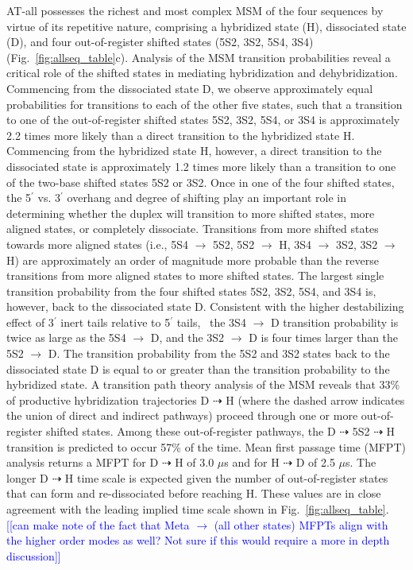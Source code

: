 \documentclass[journal=jpcbfk,manuscript=article]{achemso}
\newcommand*{\noteb}[1]{\textcolor{blue}{[[#1]]}}		%
\begin{document}
AT-all possesses the richest and most complex MSM of the four sequences by virtue of its repetitive nature, comprising a hybridized state (H), dissociated state (D), and four out-of-register shifted states (5S2, 3S2, 5S4, 3S4) (Fig.~\ref{fig:allseq_table}c). Analysis of the MSM transition probabilities reveal a critical role of the shifted states in mediating hybridization and dehybridization. Commencing from the dissociated state D, we observe approximately equal probabilities for transitions to each of the other five states, such that a transition to one of the out-of-register shifted states 5S2, 3S2, 5S4, or 3S4 is approximately 2.2 times more likely than a direct transition to the hybridized state H. Commencing from the hybridized state H, however, a direct transition to the dissociated state is approximately 1.2 times more likely than a transition to one of the two-base shifted states 5S2 or 3S2. Once in one of the four shifted states, the 5$^\prime$ vs. 3$^\prime$ overhang and degree of shifting play an important role in determining whether the duplex will transition to more shifted states, more aligned states, or completely dissociate. Transitions from more shifted states towards more aligned states (i.e., 5S4 $\rightarrow$ 5S2, 5S2 $\rightarrow$ H, 3S4 $\rightarrow$ 3S2, 3S2 $\rightarrow$ H) are approximately an order of magnitude more probable than the reverse transitions from more aligned states to more shifted states. The largest single transition probability from the four shifted states 5S2, 3S2, 5S4, and 3S4 is, however, back to the dissociated state D. Consistent with the higher destabilizing effect of 3$^\prime$ inert tails relative to 5$^\prime$ tails,~\citep{Doktycz1990ThermodynamicATGC, Dickman2012ThermodynamicDNAs, Michele2014EHybridization} the 3S4 $\rightarrow$ D transition probability is twice as large as the 5S4 $\rightarrow$ D, and the 3S2 $\rightarrow$ D is four times larger than the 5S2 $\rightarrow$ D. The transition probability from the 5S2 and 3S2 states back to the dissociated state D is equal to or greater than the transition probability to the hybridized state. A transition path theory analysis of the MSM reveals that 33\% of productive hybridization trajectories D $\dashrightarrow$ H (where the dashed arrow indicates the union of direct and indirect pathways) proceed through one or more out-of-register shifted states. Among these out-of-register pathways, the D $\dashrightarrow$ 5S2 $\dashrightarrow$ H transition is predicted to occur 57\% of the time. Mean first passage time (MFPT) analysis returns a MFPT for D $\dashrightarrow$ H of 3.0 $\mu$s and for H $\dashrightarrow$ D of 2.5 $\mu$s. The longer D $\dashrightarrow$ H time scale is expected given the number of out-of-register states that can form and re-dissociated before reaching H. These values are in close agreement with the leading implied time scale shown in  Fig.~\ref{fig:allseq_table}.  \noteb{can make note of the fact that Meta $\rightarrow$ (all other states) MFPTs align with the higher order modes as well? Not sure if this would require a more in depth discussion}
\end{document}
